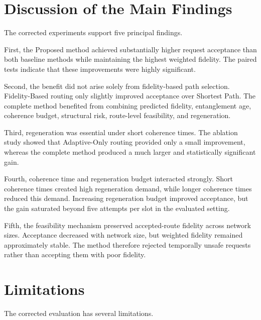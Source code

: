 \section{Discussion of the Main Findings}

The corrected experiments support five principal findings.

First, the Proposed method achieved substantially higher request acceptance than
both baseline methods while maintaining the highest weighted fidelity. The
paired tests indicate that these improvements were highly significant.

Second, the benefit did not arise solely from fidelity-based path selection.
Fidelity-Based routing only slightly improved acceptance over Shortest Path.
The complete method benefited from combining predicted fidelity, entanglement
age, coherence budget, structural risk, route-level feasibility, and
regeneration.

Third, regeneration was essential under short coherence times. The ablation
study showed that Adaptive-Only routing provided only a small improvement,
whereas the complete method produced a much larger and statistically significant
gain.

Fourth, coherence time and regeneration budget interacted strongly. Short
coherence times created high regeneration demand, while longer coherence times
reduced this demand. Increasing regeneration budget improved acceptance, but
the gain saturated beyond five attempts per slot in the evaluated setting.

Fifth, the feasibility mechanism preserved accepted-route fidelity across
network sizes. Acceptance decreased with network size, but weighted fidelity
remained approximately stable. The method therefore rejected temporally unsafe
requests rather than accepting them with poor fidelity.

\section{Limitations}

The corrected evaluation has several limitations.

